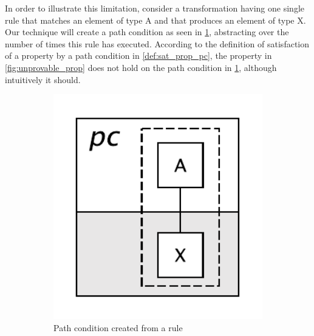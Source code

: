 In order to illustrate this limitation, consider a transformation having one single rule that matches an element of type A and that produces an element of type X. Our technique will create a path condition as seen in \cref{fig:unprovable_pc}, abstracting over the number of times this rule has executed. According to the definition of satisfaction of a property by a path condition in \cref{def:sat_prop_pc}, the property in \cref{fig:unprovable_prop} does not hold on the path condition in \cref{fig:unprovable_pc}, although intuitively it should.

\begin{figure}[htb]
        \centering
        \begin{subfigure}[b]{0.144\textwidth}
                \centering
                \includegraphics[width=1\textwidth]{./figures/property_proving/unprovable_rule.pdf}
                \caption{Path condition created from a rule}
                \label{fig:unprovable_pc}
        \end{subfigure}%
        ~~
        \begin{subfigure}[b]{0.20\textwidth}
                \centering

\end{subfigure}
\end{figure}
